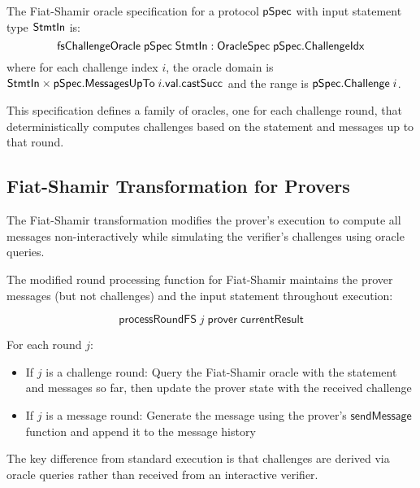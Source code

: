 \begin{definition}
    \label{def:fiat_shamir_spec}
    The Fiat-Shamir oracle specification for a protocol $\mathsf{pSpec}$ with input statement type $\mathsf{StmtIn}$ is:
    \[ \mathsf{fsChallengeOracle} \;\mathsf{pSpec} \;\mathsf{StmtIn} : \mathsf{OracleSpec} \;\mathsf{pSpec}.\mathsf{ChallengeIdx} \]
    where for each challenge index $i$, the oracle domain is $\mathsf{StmtIn} \times \mathsf{pSpec}.\mathsf{MessagesUpTo} \;i.\mathsf{val}.\mathsf{castSucc}$ and the range is $\mathsf{pSpec}.\mathsf{Challenge} \;i$.

    This specification defines a family of oracles, one for each challenge round, that deterministically computes challenges based on the statement and messages up to that round.
\end{definition}

\subsection{Fiat-Shamir Transformation for Provers}\label{sec:fiat_shamir_prover}

The Fiat-Shamir transformation modifies the prover's execution to compute all messages non-interactively while simulating the verifier's challenges using oracle queries.

\begin{definition}
    \label{def:prover_process_round_fs}
    The modified round processing function for Fiat-Shamir maintains the prover messages (but not challenges) and the input statement throughout execution:

    \[ \mathsf{processRoundFS} \;j \;\mathsf{prover} \;\mathsf{currentResult} \]

    For each round $j$:
    \begin{itemize}
        \item If $j$ is a challenge round: Query the Fiat-Shamir oracle with the statement and messages so far, then update the prover state with the received challenge
        \item If $j$ is a message round: Generate the message using the prover's $\mathsf{sendMessage}$ function and append it to the message history
    \end{itemize}

    The key difference from standard execution is that challenges are derived via oracle queries rather than received from an interactive verifier.
\end{definition}

